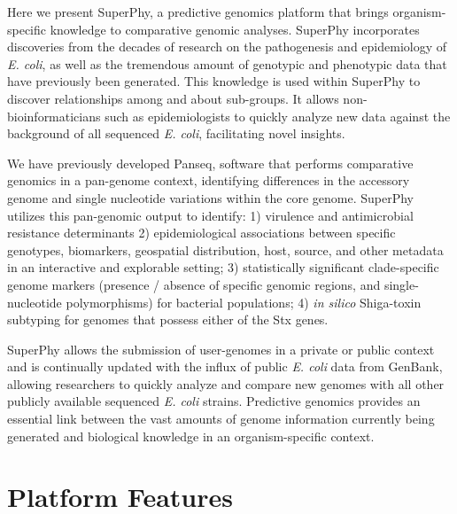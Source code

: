 \documentclass[doublespacing, linenumbers]{bmcart}
\begin{document}
Here we present SuperPhy, a predictive genomics platform that brings organism-specific knowledge to comparative genomic analyses. SuperPhy incorporates discoveries from the decades of research on the pathogenesis and epidemiology of \textit{E. coli}, as well as the tremendous amount of genotypic and phenotypic data that have previously been generated. This knowledge is used within SuperPhy to discover relationships among and about sub-groups. It allows non-bioinformaticians such as epidemiologists to quickly analyze new data against the background of all sequenced \textit{E. coli}, facilitating novel insights.

We have previously developed Panseq, software that performs comparative genomics in a  pan-genome context,  identifying differences in the accessory genome and single nucleotide variations within the core genome\cite{laing_pan-genome_2010}. SuperPhy utilizes this pan-genomic output to identify: 1) virulence and antimicrobial resistance determinants 2) epidemiological associations between specific genotypes, biomarkers, geospatial distribution, host, source, and other metadata in an interactive and explorable setting; 3) statistically significant clade-specific genome markers (presence / absence of specific genomic regions, and single-nucleotide polymorphisms) for bacterial populations; 4) \textit{in silico} Shiga-toxin subtyping for genomes that possess either of the Stx genes.

SuperPhy allows the submission of user-genomes in a private or public context and is continually updated with the influx of public \textit{E. coli} data from GenBank, allowing researchers to quickly analyze and compare new genomes with all other publicly available sequenced \textit{E. coli} strains. Predictive genomics provides an essential link between the vast amounts of genome information currently being generated and biological knowledge in an organism-specific context. 

\section{Platform Features}
\end{document}
